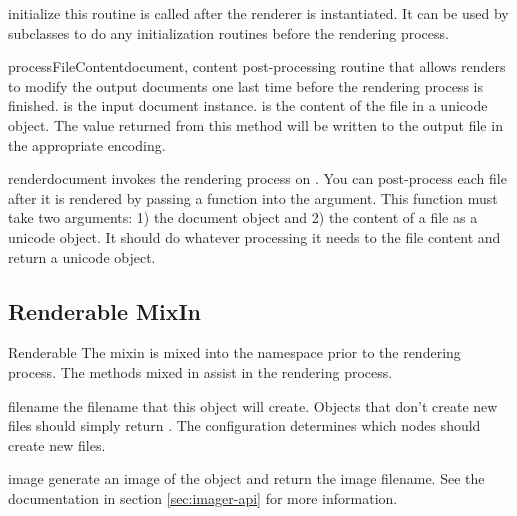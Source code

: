\begin{methoddesc}[Renderer]{initialize}{}
this routine is called after the renderer is instantiated.  It can be used
by subclasses to do any initialization routines before the rendering process.
\end{methoddesc}

\begin{methoddesc}[Renderer]{processFileContent}{document, content}
post-processing routine that allows renders to modify the output documents
one last time before the rendering process is finished.  
is the input document instance.   is the content of the 
file in a unicode object.  The value returned from this method will be
written to the output file in the appropriate encoding.
\end{methoddesc}

\begin{methoddesc}[Renderer]{render}{document}
invokes the rendering process on .  You can post-process each
file after it is rendered by passing a function into the 
argument.  This function must take two arguments: 1) the document object and
2) the content of a file as a unicode object.  It should do whatever 
processing it needs to the file content and return a unicode object.
\end{methoddesc}


\subsection{Renderable MixIn}

\begin{classdesc}{Renderable}{}
The  mixin is mixed into the  namespace
prior to the rendering process.  The methods mixed in assist in the 
rendering process.
\end{classdesc}

\begin{memberdesc}[Renderable]{filename}
the filename that this object will create.  Objects that don't create 
new files should simply return .   The configuration determines
which nodes should create new files. 
\end{memberdesc}

\begin{memberdesc}[Renderable]{image}
generate an image of the object and return the image filename.  See
the  documentation in section \ref{sec:imager-api} for
more information.
\end{memberdesc}

